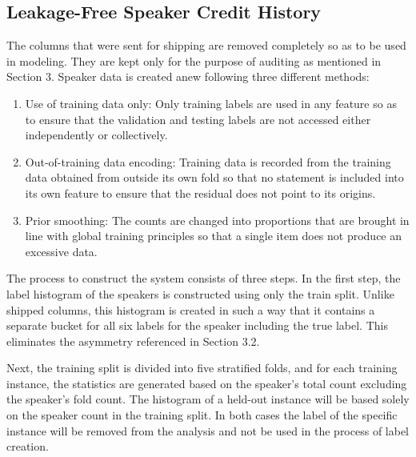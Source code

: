 \documentclass[10pt,twocolumn,twoside,a4paper]{article}
\begin{document}
\subsection{Leakage-Free Speaker Credit History}

The columns that were sent for shipping are removed completely so as to be used in modeling. They are kept only for the purpose of auditing as mentioned in Section 3. Speaker data is created anew following three different methods:

\begin{enumerate}
\item Use of training data only: Only training labels are used in any feature so as to ensure that the validation and testing labels are not accessed either independently or collectively.
\item Out-of-training data encoding: Training data is recorded from the training data obtained from outside its own fold so that no statement is included into its own feature to ensure that the residual does not point to its origins.
\item Prior smoothing: The counts are changed into proportions that are brought in line with global training principles so that a single item does not produce an excessive data.
\end{enumerate}

The process to construct the system consists of three steps. In the first step, the label histogram of the speakers is constructed using only the train split. Unlike shipped columns, this histogram is created in such a way that it contains a separate bucket for all six labels for the speaker including the true label. This eliminates the asymmetry referenced in Section 3.2.

Next, the training split is divided into five stratified folds, and for each training instance, the statistics are generated based on the speaker's total count excluding the speaker's fold count. The histogram of a held-out instance will be based solely on the speaker count in the training split. In both cases the label of the specific instance will be removed from the analysis and not be used in the process of label creation.
\end{document}
